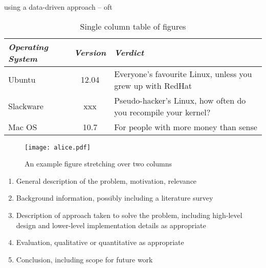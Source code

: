 using a data-driven approach -- oft

\begin{table}
\begin{tabular}{l||c||p{2cm}}
\emph{Operating System} & \emph{Version} & \emph{Verdict} \\ \hline \hline
Ubuntu & 12.04 & Everyone's favourite Linux, unless you grew up with
RedHat \\ \hline
Slackware & xxx & Pseudo-hacker's Linux, how often do you recompile
your kernel? \\ \hline
Mac OS & 10.7 & For people with more money than sense \\ \hline
\end{tabular}
\caption{\label{tab-eg}Single column table of figures}
\end{table}

\begin{figure*}
\begin{center}
\texttt{[image: alice.pdf]}
\end{center}
\caption{\label{fig-eg}An example figure stretching over two columns}
\end{figure*}

\begin{enumerate}
\item General description of the problem, motivation, relevance
\item Background information, possibly including a literature survey
\item Description of approach taken to solve the problem, including
  high-level design and lower-level implementation details as appropriate
\item Evaluation, qualitative or quantitative as appropriate
\item Conclusion, including scope for future work
\end{enumerate}

